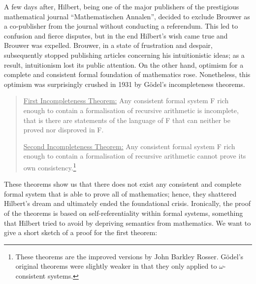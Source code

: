 \documentclass{article}
\begin{document}
A few days after, Hilbert, being one of the major publishers of the prestigious mathematical journal ``Mathematischen Annalen'', decided to exclude Brouwer as a co-publisher from the journal without conducting a referendum. This led to confusion and fierce disputes, but in the end Hilbert's wish came true and Brouwer was expelled. Brouwer, in a state of frustration and despair, subsequently stopped publishing articles concerning his intuitionistic ideas; as a result, intuitionism lost its public attention.
On the other hand, optimism for a complete and consistent formal foundation of mathematics rose. Nonetheless, this optimism was surprisingly crushed in 1931 by Gödel's incompleteness theorems.
\begin{quote}
\underline{First Incompleteness Theorem:} Any consistent formal system F rich enough to contain a formalisation of recursive arithmetic is incomplete, that is there are statements of the language of F that can neither be proved nor disproved in F.

\underline{Second Incompleteness Theorem:} Any consistent formal system F rich enough to contain a formalisation of recursive arithmetic cannot prove its own consistency.\footnote{These theorems are the improved versions by John Barkley Rosser. Gödel's original theorems were slightly weaker in that they only applied to $\omega$-consistent systems.\cite[pp.~293--320]{fraenkel}}
\end{quote}
These theorems show us that there does not exist any consistent and complete formal system that is able to prove all of mathematics; hence, they shattered Hilbert's dream and ultimately ended the foundational crisis. Ironically, the proof of the theorems is based on self-referentiality within formal systems, something that Hilbert tried to avoid by depriving semantics from mathematics.
We want to give a short sketch of a proof for the first theorem:
\end{document}
